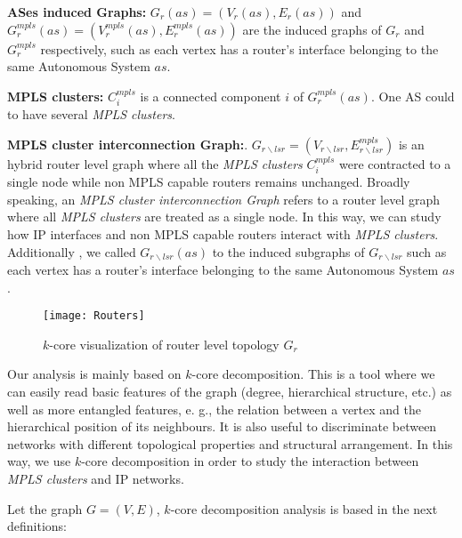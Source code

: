 \textbf{ASes induced Graphs:} $G_{r}(as)=(V_{r}(as), E_{r}(as))$ and $G^{mpls}_{r}(as)=(V^{mpls}_{r}(as),
E^{mpls}_{r}(as))$ are the induced graphs of $G_{r}$ and $G^{mpls}_{r}$
respectively, such as each  vertex has a router's interface belonging to the same Autonomous System $as$.

\textbf{MPLS clusters:} $C^{mpls}_{i}$ is a
connected component $i$ of $G^{mpls}_{r}(as)$. One AS could to have
several \textit{MPLS clusters}.    

\textbf{MPLS cluster interconnection Graph:}. $G_{r\backslash lsr}=(V_{r\backslash lsr},
E^{mpls}_{r\backslash lsr})$ is an hybrid router level graph where all the \textit{MPLS clusters}  $C^{mpls}_{i}$ were contracted to a
single node while non MPLS capable routers remains unchanged. Broadly
speaking, an \textit{MPLS cluster interconnection Graph} refers to a router level graph where all \textit{MPLS clusters} are treated as a single node. In this way, we can study how IP
interfaces and non MPLS capable routers interact with \textit{MPLS clusters}. Additionally , we
called $G_{r\backslash lsr}(as)$ to the induced
subgraphs of $G_{r\backslash lsr}$  such
as each vertex  has a router's interface belonging to the same Autonomous System $as$.


      
\begin{figure}[!t]
	\centering
		\texttt{[image: Routers]}
		\caption{$k$-core visualization of router level topology $G_{r}$ }
		\label{fig_k_core_routers}
\end{figure}

Our analysis is mainly based on $k$-core decomposition. This is a tool where we can easily read basic features of the graph (degree, hierarchical structure, etc.) as well as more entangled features, e. g., the relation between a vertex and the hierarchical position of its neighbours. It is also useful to  discriminate between networks with different topological properties and structural arrangement. In this way, we use $k$-core decomposition in order to study the interaction between \textit{MPLS clusters} and IP networks. 

Let the graph $G=(V,E)$, $k$-core decomposition analysis is based in the next definitions:

